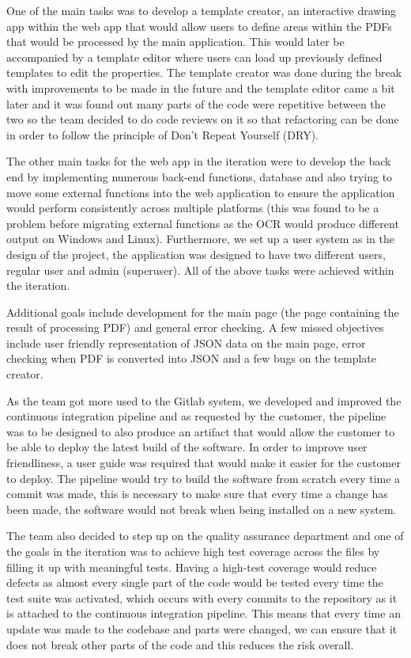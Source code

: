 \documentclass{l3proj}
\begin{document}
One of the main tasks was to develop a template creator, an interactive drawing app within the web app that would allow users to define areas within the PDFs that would be processed by the main application. This would later be accompanied by a template editor where users can load up previously defined templates to edit the properties. The template creator was done during the break with improvements to be made in the future and the template editor came a bit later and it was found out many parts of the code were repetitive between the two so the team decided to do code reviews on it so that refactoring can be done in order to follow the principle of Don’t Repeat Yourself (DRY).

The other main tasks for the web app in the iteration were to develop the back end by implementing numerous back-end functions, database and also trying to move some external functions into the web application to ensure the application would perform consistently across multiple platforms (this was found to be a problem before migrating external functions as the OCR would produce different output on Windows and Linux). Furthermore, we set up a user system as in the design of the project, the application was designed to have two different users, regular user and admin (superuser). All of the above tasks were achieved within the iteration.

Additional goals include development for the main page (the page containing the result of processing PDF) and general error checking. A few missed objectives include user friendly representation of JSON data on the main page, error checking when PDF is converted into JSON and a few bugs on the template creator. 

As the team got more used to the Gitlab system, we developed and improved the continuous integration pipeline and as requested by the customer, the pipeline was to be designed to also produce an artifact that would allow the customer to be able to deploy the latest build of the software. In order to improve user friendliness, a user guide was required that would make it easier for the customer to deploy. The pipeline would try to build the software from scratch every time a commit was made, this is necessary to make sure that every time a change has been made, the software would not break when being installed on a new system.

The team also decided to step up on the quality assurance department and one of the goals in the iteration was to achieve high test coverage across the files by filling it up with meaningful tests. Having a high-test coverage would reduce defects as almost every single part of the code would be tested every time the test suite was activated, which occurs with every commits to the repository as it is attached to the continuous integration pipeline. This means that every time an update was made to the codebase and parts were changed, we can ensure that it does not break other parts of the code and this reduces the risk overall.
\end{document}
